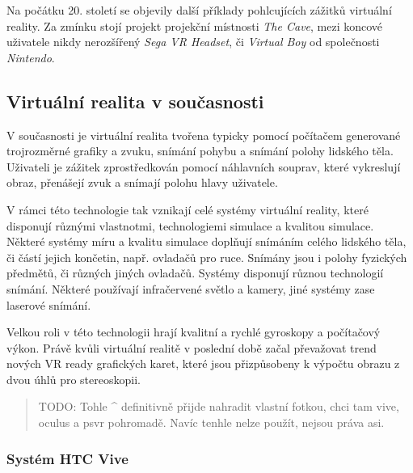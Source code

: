 Na počátku 20. století se objevily další příklady pohlcujících zážitků
virtuální reality. Za zmínku stojí projekt projekční místnosti \emph{The
Cave}, mezi koncové uživatele nikdy nerozšířený \emph{Sega VR Headset},
či \emph{Virtual Boy} od společnosti \emph{Nintendo}.


\subsection{Virtuální realita v
současnosti}\label{virtuuxe1lnuxed-realita-v-souux10dasnosti}

V současnosti je virtuální realita tvořena typicky pomocí počítačem
generované trojrozměrné grafiky a zvuku, snímání pohybu a snímání polohy
lidského těla. Uživateli je zážitek zprostředkován pomocí náhlavních
souprav, které vykreslují obraz, přenášejí zvuk a snímají polohu hlavy
uživatele.

V rámci této technologie tak vznikají celé systémy virtuální reality,
které disponují různými vlastnotmi, technologiemi simulace a kvalitou
simulace. Některé systémy míru a kvalitu simulace doplňují snímáním
celého lidského těla, či částí jejich končetin, např. ovladačů pro ruce.
Snímány jsou i polohy fyzických předmětů, či různých jiných ovladačů.
Systémy disponují různou technologií snímání. Některé používají
infračervené světlo a kamery, jiné systémy zase laserové snímání.

Velkou roli v této technologii hrají kvalitní a rychlé gyroskopy a
počítačový výkon. Právě kvůli virtuální realitě v poslední době začal
převažovat trend nových VR ready grafických karet, které jsou
přizpůsobeny k výpočtu obrazu z dvou úhlů pro stereoskopii.


\begin{quote}
TODO: Tohle \^{} definitivně přijde nahradit vlastní fotkou, chci tam
vive, oculus a psvr pohromadě. Navíc tenhle nelze použít, nejsou práva
asi.
\end{quote}

\subsubsection{Systém HTC Vive}\label{systuxe9m-htc-vive}

